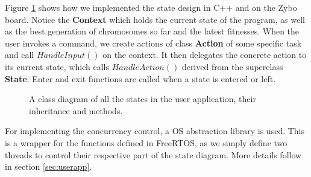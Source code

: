 Figure \ref{fig:classdiagram} shows how we implemented the state design in C++ and on the Zybo board. Notice the \textbf{Context} which holds the current state of the program, as well as the best generation of chromosomes so far and the latest fitnesses. When the user invokes a command, we create actions of class \textbf{Action} of some specific task and call $HandleInput()$ on the context. It then delegates the concrete action to its current state, which calls $HandleAction()$ derived from the superclass \textbf{State}. Enter and exit functions are called when a state is entered or left.

\begin{figure}[h!]
	\centering
	\caption{A class diagram of all the states in the user application, their inheritance and methods.}
	\label{fig:classdiagram}
\end{figure}

For implementing the concurrency control, a OS abstraction library is used. This is a wrapper for the functions defined in FreeRTOS, as we simply define two threads to control their respective part of the state diagram. More details follow in section \ref{sec:userapp}.
